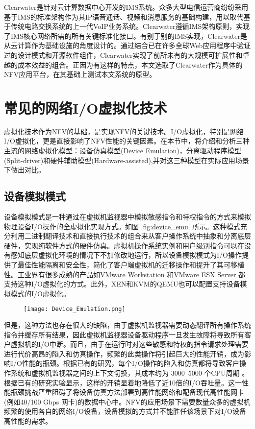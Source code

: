 Clearwater是针对云计算数据中心开发的IMS系统。众多大型电信运营商纷纷采用基于IMS的标准架构作为其IP语音通话、视频和消息服务的基础构建，用以取代基于传统电路交换系统的上一代VoIP业务系统。Clearwater遵循IMS架构原则，实现了IMS核心网络所需的所有关键标准化接口。有别于别的IMS实现，Clearwater是从云计算作为基础设施的角度设计的。通过结合已在许多全球Web应用程序中验证过的设计模式和开源软件组件，Clearwater实现了前所未有的大规模可扩展性和卓越的成本效益的组合。正因为有这样的特点，本文选取了Clearwater作为具体的NFV应用平台，在其基础上测试本文系统的原型。

\section{常见的网络I/O虚拟化技术}
虚拟化技术作为NFV的基础，是实现NFV的关键技术。I/O虚拟化，特别是网络I/O虚拟化，更是直接影响了NFV性能的关键因素。在本节中，将介绍和分析三种主流的网络虚拟化模型：设备仿真模型(Device Emulation)，分离驱动程序模型(Split-driver)和硬件辅助模型(Hardware-assisted),并对这三种模型在实际应用场景下做出对比。

\subsection{设备模拟模式}
设备模拟模式是一种通过在虚拟机监视器中模拟敏感指令和特权指令的方式来模拟物理设备I/O操作的全虚拟化实现方式。如图 \ref{fig:device_emu} 所示。这种模式充分利用二进制翻译技术和直接执行技术的组合来从客户操作系统中抽象和分离底层硬件，实现纯软件方式的硬件仿真。虚拟机操作系统实例和用户级别指令可以在没有感知底层虚拟化环境的情况下不加修改地运行，所以设备模拟模式为I/O操作提供了最佳性能隔离和安全性，简化了客户端虚拟机的迁移操作和提升了其可移植性。工业界有很多成熟的产品如VMware Workstation \cite{sugerman2001virtualizing} 和VMware ESX Server \cite{ahmad2003analysis} 都支持这种I/O虚拟化的方式。此外，XEN和KVM的QEMU也可以配置支持设备模拟模式的I/O虚拟化。
\begin{figure}[!htp]
	\centering
	\texttt{[image: Device\_Emulation.png]}
\end{figure}
但是，这种方法也存在很大的缺陷，由于虚拟机监视器需要动态翻译所有操作系统指令并缓存所有结果，因此虚拟机监视器设备驱动程序一旦发生故障将导致所有客户虚拟机的I/O中断。而且，由于在运行时对这些敏感和特权的指令请求处理需要进行代价高昂的陷入和仿真操作，频繁的此类操作将引起巨大的性能开销，成为影响I/O性能的瓶颈。根据已有的研究，每个I/O操作的陷入和仿真都将导致客户操作系统和虚拟机监视器之间的上下文切换，其成本约为 3000~5000 个CPU周期  。根据已有的研究实验显示，这样的开销显着地降低了近10倍的I/O吞吐量。这一性能瓶颈挑战严重阻碍了将设备仿真方法部署到高性能网络和配备现代高性能网卡(例如40/100 Gbps 网卡)的数据中心中。NFV的应用场景下需要数量众多的虚拟机频繁的使用各自的网络I/O设备，设备模拟的方式并不能胜任该场景下对I/O设备高性能的需求。

